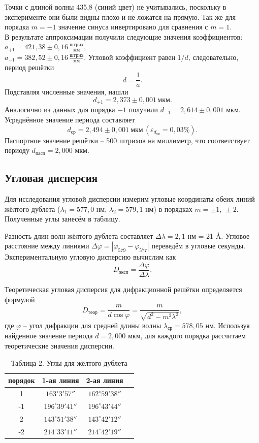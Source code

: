 \documentclass[a4paper]{article}
\begin{document}
Точки с длиной волны  435,8 (синий цвет) не учитывались, поскольку в эксперименте они были видны плохо и не ложатся на прямую. Так же для порядка $m = -1$ значение синуса инвертировано для сравнения с $m = 1$.\\
В результате аппроксимации получили следующие значения коэффициентов: $a_{+1} = 421,38 \pm 0,16 \,\frac{\text{штрих}}{\text{мм}}$, \\$a_{-1} = 382,52 \pm 0,16 \,\frac{\text{штрих}}{\text{мм}}$. Угловой коэффициент равен $1/d$, следовательно, период решётки
\[
d = \frac{1}{a}.
\]
Подставляя численные значения, нашли
\[
d_{+1} =  2,373 \pm 0,001 \, \text{мкм}.
\]
Аналогично из данных для порядка $-1$ получили $d_{-1} = 2,614 \pm 0,001$ мкм. Усреднённое значение периода составляет
\[
d_\text{ср} = 2,494\pm 0,001\ \text{мкм} \, (\varepsilon_{d_\text{ср}} = 0,03 \%).
\]
Паспортное значение решётки – 500 штрихов на миллиметр, что соответствует периоду $d_\text{пасп} = 2,000$ мкм.

\subsection{Угловая дисперсия}

Для исследования угловой дисперсии измерим угловые координаты обеих линий жёлтого дублета ($\lambda_1 = 577,0$ нм, $\lambda_2 = 579,1$ нм) в порядках $m = \pm1,\ \pm2$. Полученные углы занесём в таблицу.

Разность длин волн жёлтого дублета составляет $\Delta\lambda = 2,1$ нм = 21 Å. Угловое расстояние между линиями $\Delta\varphi = |\varphi_{579} - \varphi_{577}|$ переведём в угловые секунды. Экспериментальную угловую дисперсию вычислим как
\[
D_\text{эксп} = \frac{\Delta\varphi}{\Delta\lambda}.
\]

Теоретическая угловая дисперсия для дифракционной решётки определяется формулой
\[
D_\text{теор} = \frac{m}{d\cos\varphi} = \frac{m}{\sqrt{d^2-m^2\lambda^2}},
\]
где $\varphi$ – угол дифракции для средней длины волны $\lambda_\text{ср} = 578,05$ нм. Используя найденное значение периода $d = 2,000$ мкм, для каждого порядка рассчитаем теоретические значения дисперсии.


\begin{table}[h!]
    \centering
    \begin{tabular}{|c|c|c|c|}
        \hline
        порядок & 1-ая линия & 2-ая линия \\ \hline
        1 & $163^\circ 3'57''$ & $162^\circ 59'38''$ \\ \hline
        -1 & $196^\circ 39'41''$ & $196^\circ 43'44''$ \\ \hline
        2 & $143^\circ 51'38''$ & $143^\circ 42'12''$ \\ \hline
        -2 & $214^\circ 33'11''$ & $214^\circ 42'19''$ \\ \hline
    \end{tabular}
    \caption{Таблица 2. Углы для жёлтого дублета}
    \label{tab:yellow_angles}
\end{table}
\end{document}
